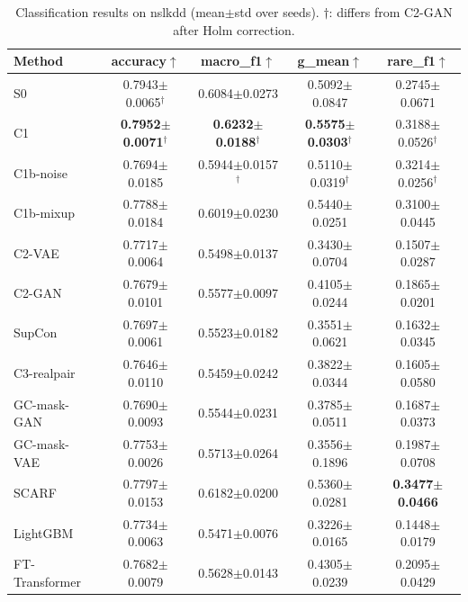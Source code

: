 \begin{table}[t]
\centering
\caption{Classification results on nslkdd (mean$\pm$std over seeds). $\dagger$: differs from C2-GAN after Holm correction.}
\label{tab:cls_nslkdd}
\small
\begin{tabular}{lcccc}
\toprule
Method & accuracy$\uparrow$ & macro\_f1$\uparrow$ & g\_mean$\uparrow$ & rare\_f1$\uparrow$ \\
\midrule
S0 & 0.7943$\pm$0.0065$^\dagger$ & 0.6084$\pm$0.0273 & 0.5092$\pm$0.0847 & 0.2745$\pm$0.0671 \\
C1 & \textbf{0.7952$\pm$0.0071}$^\dagger$ & \textbf{0.6232$\pm$0.0188}$^\dagger$ & \textbf{0.5575$\pm$0.0303}$^\dagger$ & 0.3188$\pm$0.0526$^\dagger$ \\
C1b-noise & 0.7694$\pm$0.0185 & 0.5944$\pm$0.0157$^\dagger$ & 0.5110$\pm$0.0319$^\dagger$ & 0.3214$\pm$0.0256$^\dagger$ \\
C1b-mixup & 0.7788$\pm$0.0184 & 0.6019$\pm$0.0230 & 0.5440$\pm$0.0251 & 0.3100$\pm$0.0445 \\
C2-VAE & 0.7717$\pm$0.0064 & 0.5498$\pm$0.0137 & 0.3430$\pm$0.0704 & 0.1507$\pm$0.0287 \\
C2-GAN & 0.7679$\pm$0.0101 & 0.5577$\pm$0.0097 & 0.4105$\pm$0.0244 & 0.1865$\pm$0.0201 \\
SupCon & 0.7697$\pm$0.0061 & 0.5523$\pm$0.0182 & 0.3551$\pm$0.0621 & 0.1632$\pm$0.0345 \\
C3-realpair & 0.7646$\pm$0.0110 & 0.5459$\pm$0.0242 & 0.3822$\pm$0.0344 & 0.1605$\pm$0.0580 \\
GC-mask-GAN & 0.7690$\pm$0.0093 & 0.5544$\pm$0.0231 & 0.3785$\pm$0.0511 & 0.1687$\pm$0.0373 \\
GC-mask-VAE & 0.7753$\pm$0.0026 & 0.5713$\pm$0.0264 & 0.3556$\pm$0.1896 & 0.1987$\pm$0.0708 \\
SCARF & 0.7797$\pm$0.0153 & 0.6182$\pm$0.0200 & 0.5360$\pm$0.0281 & \textbf{0.3477$\pm$0.0466} \\
LightGBM & 0.7734$\pm$0.0063 & 0.5471$\pm$0.0076 & 0.3226$\pm$0.0165 & 0.1448$\pm$0.0179 \\
FT-Transformer & 0.7682$\pm$0.0079 & 0.5628$\pm$0.0143 & 0.4305$\pm$0.0239 & 0.2095$\pm$0.0429 \\
\bottomrule
\end{tabular}
\end{table}